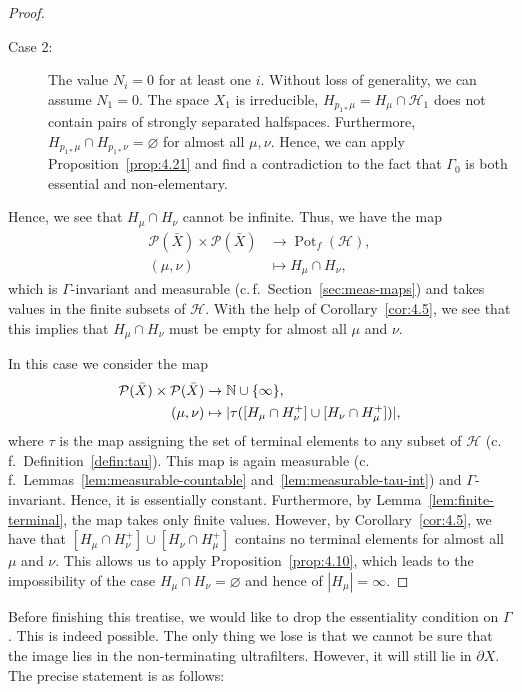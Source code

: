 \begin{proof}
\begin{description}
\begin{description}
    \item[Case 2:] The value \(N_i = 0\) for at least one \(i\). Without loss of generality, we can assume \(N_1 = 0\). The space \(X_1\) is irreducible, \(H_{p_{1\ast}\mu} = H_\mu \cap \mathcal{H}_1\) does not contain pairs of strongly separated halfspaces. Furthermore, \(H_{p_{1\ast}\mu} \cap H_{p_{1\ast}\nu} = \varnothing\) for almost all \(\mu, \nu\). Hence, we can apply Proposition~\ref{prop:4.21} and find a contradiction to the fact that \(\Gamma_0\) is both essential and non-elementary.
    \end{description}
  \end{description}
  Hence, we see that \(H_\mu \cap H_\nu\) cannot be infinite. Thus, we have the map
  \begin{align*}
    \mathcal{P}(\bar X) \times \mathcal{P}(\bar X) & \to \operatorname{Pot}_f(\mathcal{H}),\\
    (\mu,\nu) &\mapsto H_\mu \cap H_\nu,
  \end{align*}
  which is \(\Gamma\)-invariant and measurable (c.\,f.~Section~\ref{sec:meas-maps}) and takes values in the finite subsets of \(\mathcal{H}\). With the help of Corollary~\ref{cor:4.5}, we see that this implies that \(H_\mu \cap H_\nu\) must be empty for almost all \(\mu\) and \(\nu\).

  In this case we consider the map
  \begin{align*}
    \mathcal{P}(\bar X) \times \mathcal{P}(\bar X) &\to \mathbb{N} \cup \{\infty\},\\
    (\mu, \nu) &\mapsto |\tau([H_\mu \cap H_\nu^+] \cup [H_\nu \cap H_\mu^+])|,
  \end{align*}
  where \(\tau\) is the map assigning the set of terminal elements to any subset of \(\mathcal{H}\) (c.\,f.~Definition~\ref{defin:tau}). This map is again measurable (c.\,f.\ Lemmas~\ref{lem:measurable-countable} and~\ref{lem:measurable-tau-int}) and \(\Gamma\)-invariant. Hence, it is essentially constant. Furthermore, by Lemma~\ref{lem:finite-terminal}, the map takes only finite values. However, by Corollary~\ref{cor:4.5}, we have that \([H_\mu \cap H_\nu^+] \cup [H_\nu \cap H_\mu^+]\) contains no terminal elements for almost all \(\mu\) and \(\nu\). This allows us to apply Proposition~\ref{prop:4.10}, which leads to the impossibility of the case \(H_\mu \cap H_\nu = \varnothing\) and hence of \(|H_\mu| = \infty\). 
\end{proof}

Before finishing this treatise, we would like to drop the essentiality condition on \(\Gamma\). This is indeed possible. The only thing we lose is that we cannot be sure that the image lies in the non-terminating ultrafilters. However, it will still lie in \(\partial X\). The precise statement is as follows:

